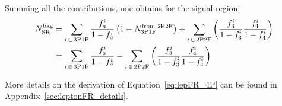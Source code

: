 Summing all the contributions, one obtains for the signal region:
\begin{equation}
  \begin{split}
    \label{eq:lepFR_4P}
    N^{\text{bkg}}_{\text{SR}} &= \sum_{i \,\in\, \text{3P1F}} \frac{f_a^i}{1-f_a^i} \left( 1 - N^{\text{from 2P2F}}_{\text{3P1F}} \right)
                               + \sum_{i \,\in\, \text{2P2F}} \left( \frac{f_3^i}{1-f_3^i} \frac{f_4^i}{1-f_4^i} \right)
    \\
                 &= \sum_{i \,\in\, \text{3P1F}} \frac{f_a^i}{1-f_a^i} - \sum_{i \,\in\, \text{2P2F}} \left( \frac{f_3^i}{1-f_3^i} \frac{f_4^i}{1-f_4^i} \right)
  \end{split}
\end{equation}

More details on the derivation of Equation~\ref{eq:lepFR_4P} can be found in Appendix~\ref{sec:leptonFR_details}.
